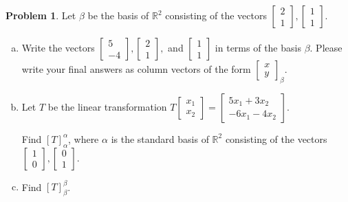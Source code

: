 \documentclass[10pt]{article}
\theoremstyle{definition}
\newtheorem{problem}[theorem]{Problem}
\newcommand{\1}[1]{\textbf{1}_{\left[#1\right]}} %
\def\R{\mathbb{R}} %
\begin{document}
\begin{problem}
  Let $\beta$ be the basis of $\R^{2}$ consisting of the vectors
  $\begin{bmatrix} 2\\1
  \end{bmatrix},
  \begin{bmatrix}
    1\\1
  \end{bmatrix}$. 
  \begin{enumerate}[(a)]
    \setlength{\itemsep}{0pt}
    \item Write the vectors $
    \begin{bmatrix}
      5\\-4
    \end{bmatrix},
    \begin{bmatrix}
      2\\1
    \end{bmatrix},
    $
    and
    $
    \begin{bmatrix}
      1\\1
    \end{bmatrix}
    $ in terms of the basis $\beta$. Please write your final answers as column
    vectors of the form $\begin{bmatrix} x\\y \end{bmatrix}_{\beta}$.
    \item Let $T$ be the linear transformation $T
    \begin{bmatrix}
      x_{1}\\x_{2}
    \end{bmatrix}=
    \begin{bmatrix}
      5x_{1}+3x_{2}\\
      -6x_{1}-4x_{2}
    \end{bmatrix}$.

    Find $[T]_{\alpha}^{\alpha}$, where $\alpha$ is the standard basis of $\R^{2}$ consisting of the vectors $
    \begin{bmatrix}
      1\\0
    \end{bmatrix},
    \begin{bmatrix}
      0\\1
    \end{bmatrix}
    $.
    \item Find $[T]_{\beta}^{\beta}$.
  \end{enumerate}
\end{problem}
\end{document}
